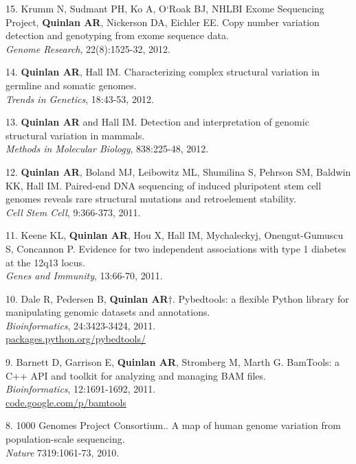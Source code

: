 \documentclass[margin,line]{cv}
\begin{document}
\begin{resume}
\begin{list}{*}{}
    \item[15.] Krumm N, Sudmant PH, Ko A, O`Roak BJ, NHLBI Exome Sequencing Project,
    \textbf{Quinlan AR}, Nickerson DA, Eichler EE.
    Copy number variation detection and genotyping from exome sequence data.\\
    \textit{Genome Research}, 22(8):1525-32, 2012.

    \item[14.] \textbf{Quinlan AR}, Hall IM.
    Characterizing complex structural variation in germline and somatic genomes.\\
    \textit{Trends in Genetics}, 18:43-53, 2012.

    \item[13.] \textbf{Quinlan AR} and Hall IM.
    Detection and interpretation of genomic structural variation in mammals.\\
    \textit{Methods in Molecular Biology}, 838:225-48, 2012.

    \item[12.] \textbf{Quinlan AR}, Boland MJ, Leibowitz ML, Shumilina S, Pehrson SM, Baldwin KK, Hall IM.
    Paired-end DNA sequencing of induced pluripotent stem cell genomes reveals
    rare structural mutations and retroelement stability.\\
    \textit{Cell Stem Cell}, 9:366-373, 2011.

    \item[11.] Keene KL, \textbf{Quinlan AR}, Hou X, Hall IM, Mychaleckyj, Onengut-Gumuscu S, Concannon P.
    Evidence for two independent associations with type 1 diabetes at the 12q13 locus.\\
    \textit{Genes and Immunity}, 13:66-70, 2011.

    \item[10.] Dale R, Pedersen B, \textbf{Quinlan AR}$\dagger$.
    Pybedtools: a flexible Python library for manipulating genomic datasets and annotations.\\
    \textit{Bioinformatics}, 24:3423-3424, 2011.\\
    \url{packages.python.org/pybedtools/}

    \item[9.] Barnett D, Garrison E, \textbf{Quinlan AR}, Stromberg M, Marth G.
    BamTools: a C++ API and toolkit for analyzing and managing BAM files.\\
    \textit{Bioinformatics}, 12:1691-1692, 2011.\\
    \url{code.google.com/p/bamtools}

    \item[8.] 1000 Genomes Project Consortium..
    A map of human genome variation from population-scale sequencing.\\
    \textit{Nature} 7319:1061-73, 2010.


\end{list}
\end{resume}
\end{document}
